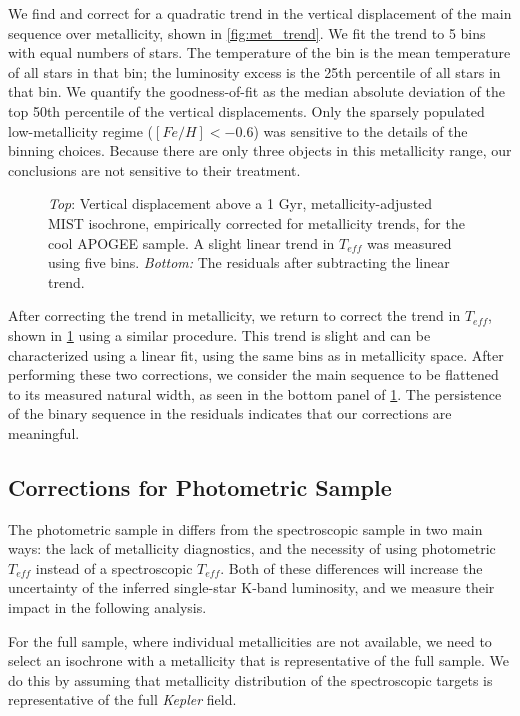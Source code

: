 \documentclass[manuscript]{aastex6}
\newcommand{\Kepler}{\mbox{\textit{Kepler}}}
\newcommand{\Teff}{\ensuremath{T_{eff}}}
\begin{document}
We find and correct for a quadratic trend in the vertical displacement of the
main sequence over metallicity, shown in \cref{fig:met_trend}.
We fit the trend to 5 bins with equal numbers of stars. The
temperature of the bin is the mean temperature of all stars in that bin; the
luminosity excess is the 25th percentile of all stars in that bin. We quantify 
the goodness-of-fit as the median absolute deviation of the top 50th 
percentile of the vertical displacements. Only the sparsely populated 
low-metallicity regime (\([Fe/H] < -0.6\)) was sensitive to the details of the 
binning choices. Because there are only three objects in this metallicity 
range, our conclusions are not sensitive to their treatment.

\begin{figure}[htb]
    \centering
    \caption{\emph{Top}: Vertical displacement above a 1 Gyr,
        metallicity-adjusted MIST isochrone, empirically corrected for
        metallicity trends, for the cool APOGEE sample. A 
        slight linear trend in \Teff{} was measured using five bins. 
        \emph{Bottom:} The residuals after subtracting the linear 
    trend.}\label{fig:apogee_teff_trend}
\end{figure}

After correcting the trend in metallicity, we return to correct the trend in
\Teff{}, shown in \cref{fig:apogee_teff_trend} using a similar procedure. This 
trend is slight and can be characterized using a linear fit, using the same 
bins as in metallicity space. After performing these two corrections, we 
consider the main sequence to be flattened to its measured natural width, as
seen in the bottom panel of \cref{fig:apogee_teff_trend}. The persistence of 
the binary sequence in the residuals indicates that our corrections are 
meaningful.  

\subsection{Corrections for Photometric Sample}

The photometric sample in \citet{McQuillan14} differs from the spectroscopic
sample in two main ways: the lack of metallicity diagnostics, and the necessity
of using photometric \Teff{} instead of a spectroscopic \Teff{}. Both of these
differences will increase the uncertainty of the inferred single-star K-band
luminosity, and we measure their impact in the following analysis.

For the full \citet{McQuillan14} sample, where individual metallicities are not
available, we need to select an isochrone with a metallicity that is 
representative of the full sample. We do this by assuming that metallicity 
distribution of the spectroscopic targets is representative of the full 
\Kepler{} field. 
\end{document}
